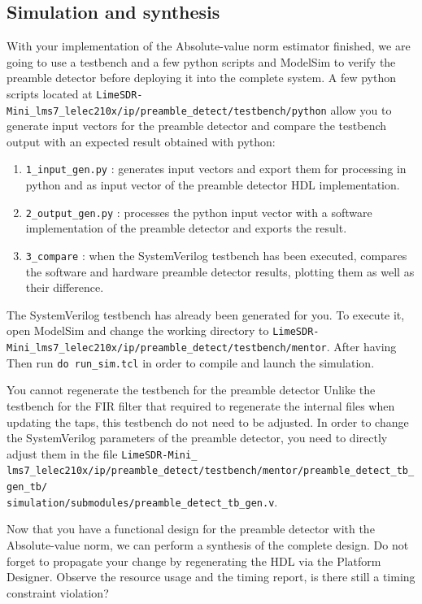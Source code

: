 \subsection{Simulation and synthesis}
\begin{sloppypar}
With your implementation of the Absolute-value norm estimator finished, we are going to use a testbench and a few python scripts and ModelSim to verify the preamble detector before deploying it into the complete system. A few python scripts located at \texttt{LimeSDR-Mini\_lms7\_lelec210x/ip/preamble\_detect/testbench/python} allow you to generate input vectors for the preamble detector and compare the testbench output with an expected result obtained with python:

\begin{enumerate}
    \item \texttt{1\_input\_gen.py} : generates input vectors and export them for processing in python and as input vector of the preamble detector HDL implementation.
    \item \texttt{2\_output\_gen.py} : processes the python input vector with a software implementation of the preamble detector and exports the result.
    \item \texttt{3\_compare} : when the SystemVerilog testbench has been executed, compares the software and hardware preamble detector results, plotting them as well as their difference.
\end{enumerate}

The SystemVerilog testbench has already been generated for you. To execute it, open ModelSim and change the working directory to \texttt{LimeSDR-Mini\_lms7\_lelec210x/ip/preamble\_detect/testbench/mentor}. After having Then run \texttt{do run\_sim.tcl} in order to compile and launch the simulation.



\end{sloppypar}
\begin{bclogo}[couleur = gray!20, arrondi = 0.2, logo=\bcattention]{You cannot regenerate the testbench for the preamble detector}
    Unlike the testbench for the FIR filter that required to regenerate the internal files when updating the taps, this testbench do not need to be adjusted. In order to change the SystemVerilog parameters of the preamble detector, you need to directly adjust them in the file \texttt{LimeSDR-Mini\_}\\\texttt{lms7\_lelec210x/ip/preamble\_detect/testbench/mentor/preamble\_detect\_tb\_gen\_tb/}\\\texttt{simulation/submodules/preamble\_detect\_tb\_gen.v}.
\end{bclogo}

Now that you have a functional design for the preamble detector with the Absolute-value norm, we can perform a synthesis of the complete design. Do not forget to propagate your change by regenerating the HDL via the Platform Designer. Observe the resource usage and the timing report, is there still a timing constraint violation? 


